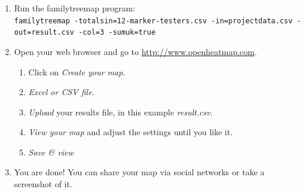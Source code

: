 \documentclass[12pt,a4paper]{article}
\begin{document}
\begin{enumerate}
\item Run the familytreemap program:\\
  \texttt{familytreemap -totalsin=12-marker-testers.csv -in=projectdata.csv -out=result.csv -col=3 -sumuk=true}
\item Open your web browser and go to
      \href{http://www.openheatmap.com/}{http://www.openheatmap.com}.
	\begin{enumerate}
	\item Click on \emph{Create your map}.
	\item \emph{Excel or CSV file}.
	\item \emph{Upload} your results file,
            in this example \emph{result.csv}.
	\item \emph{View your map} and adjust the settings until you like it.
	\item \emph{Save \& view}
	\end{enumerate}
\item You are done! You can share your map via social networks
  or take a screenshot of it.
\end{enumerate}
\end{document}
